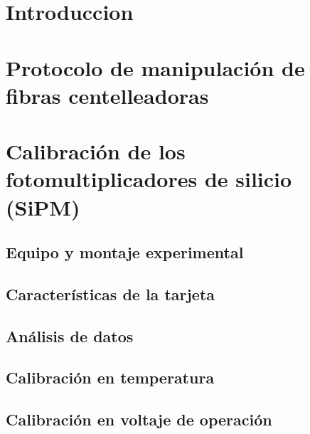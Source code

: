 \documentclass[11pt,a4paper]{article}
\begin{document}


\tableofcontents
\newpage


\section{Introduccion}  \label{sec:Introduccion}


\newpage
\section{Protocolo de manipulación de fibras centelleadoras} \label{sec:Fibras}


\newpage
\section{Calibración de los fotomultiplicadores de silicio (SiPM)} \label{sec:SiPM}

	\subsection{Equipo y montaje experimental}\label{sec:Equipo}
	
	
	\subsection{Características de la tarjeta}\label{sec:Tarjeta}
	
	
	\subsection{Análisis de datos}\label{sec:Analisis}
	
	
	\subsection{Calibración en temperatura}\label{sec:Temperatura}
	

	\subsection{Calibración en voltaje de operación}\label{sec:Voltaje}
	
	
\end{document}
